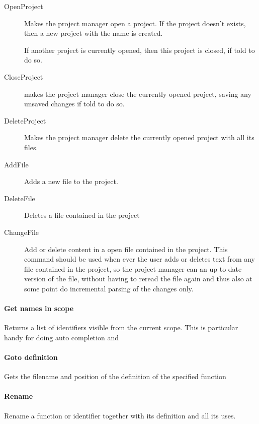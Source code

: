 \documentclass[a4paper, oneside, final]{memoir}
\theoremstyle{definition}
\begin{document}
\begin{description}
\item[OpenProject] Makes the project manager open a project. If the
  project doesn't exists, then a new project with the name is created.

  If another project is currently opened, then this project is closed, if told
  to do so.
\item[CloseProject] makes the project manager close the currently opened project,
  saving any unsaved changes if told to do so. 
\item[DeleteProject] Makes the project manager delete the currently opened project
  with all its files.
\item[AddFile] Adds a new file to the project.
\item[DeleteFile] Deletes a file contained in the project
\item[ChangeFile] Add or delete content in a open file contained in the
  project. This command should be used when ever the user adds or deletes text
  from any file contained in the project, so the project manager can an
  up to date version of the file, without having to reread the file again and
  thus also at some point do incremental parsing of the changes only.
\end{description}


\paragraph{Get names in scope}

Returns a list of identifiers visible from the current scope. This is particular
handy for doing auto completion and 


\paragraph{Goto definition}

Gets the filename and position of the definition of the specified function

\paragraph{Rename}

Rename a function or identifier together with its definition and all its uses.
\end{document}
